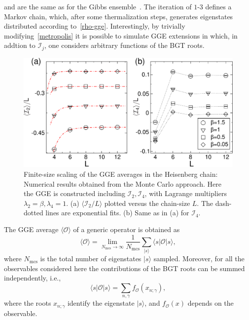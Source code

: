 \documentclass[twocolumn,superscriptaddress,prb,10pt]{revtex4-1}
\begin{document}
and are the same as for the Gibbs ensemble~\cite{gu-2005}. The iteration of $1$-$3$ defines a Markov 
chain, which, after some thermalization steps, generates eigenstates distributed according 
to~\eqref{rho-gge}. Interestingly, by trivially modifying~\eqref{metropolis} it is possible to 
simulate GGE extensions in which, in addtion to ${\mathcal I}_j$, one considers 
arbitrary functions of the BGT roots.  
%
\begin{figure}[t]
\includegraphics*[width=0.93\linewidth]{fig2}
\caption{Finite-size scaling of the GGE averages in the Heisenberg chain: Numerical results 
 obtained from the Monte Carlo approach. Here the GGE is constructed including 
 ${\mathcal I}_2,{\mathcal I}_4$, with Lagrange multipliers $\lambda_2=\beta,
 \lambda_4=1$. (a) $\langle {\mathcal I}_2/L\rangle$ plotted versus the chain-size 
 $L$. The dash-dotted lines are exponential fits. (b) Same as 
 in (a) for ${\mathcal I}_4$.
}
\label{fig2}
\end{figure}
%
The GGE average $\langle{\mathcal O}\rangle$ of a generic operator is obtained as  
%
\begin{equation}
\label{gge-mc}
\langle{\mathcal O}\rangle=\lim\limits_{N_\textrm{mcs}\to\infty}\frac{1}
{N_\textrm{mcs}}\sum\limits_{|s\rangle}\langle s|{\mathcal O}
|s\rangle,
\end{equation}
%
where $N_{\textrm{mcs}}$ is the total number of eigenstates $|s\rangle$ sampled. 
Moreover, for all the observables considered here the contributions 
of the BGT roots can be summed independently, i.e., 
%
\begin{equation}
\label{gge-mc-1}
\langle s|{\mathcal O}|s\rangle=\sum\limits_{n,\gamma}f_{{\mathcal O}}(x_{n;\gamma}), 
\end{equation}
%
where the roots $x_{n;\gamma}$ identify the eigenstate $|s\rangle$, and 
$f_{{\mathcal O}}(x)$ depends on the observable. 
\end{document}

